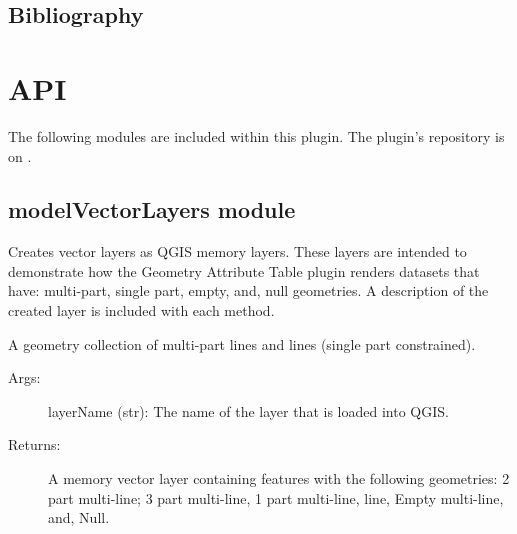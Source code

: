 \documentclass[letterpaper,11pt,english]{sphinxmanual}
\begin{document}
\section{Bibliography}
\label{\detokenize{concept:bibliography}}



\chapter{API}
\label{\detokenize{API:api}}\label{\detokenize{API::doc}}
The following modules are included within this plugin.  The plugin’s repository is
on .


\section{modelVectorLayers module}
\label{\detokenize{API:module-modelVectorLayers}}\label{\detokenize{API:modelvectorlayers-module}}\label{\detokenize{API:modelvectorlayers-api}}
Creates vector layers as QGIS memory layers.  These layers are intended to demonstrate how the Geometry Attribute Table
plugin renders datasets that have: multi-part, single part, empty, and, null geometries.  A description of the created
layer is included with each method.

\begin{fulllineitems}
\label{\detokenize{API:modelVectorLayers.createMultiLines}}
A geometry collection of multi-part lines and lines (single part constrained).
\begin{description}
\item[{Args:}] \leavevmode
layerName (str): The name of the layer that is loaded into QGIS.

\item[{Returns:}] \leavevmode
A memory vector layer containing features with the following geometries: 2 part multi-line; 3 part multi-line,
1 part multi-line, line, Empty multi-line, and, Null.

\end{description}

\end{fulllineitems}
\end{document}
